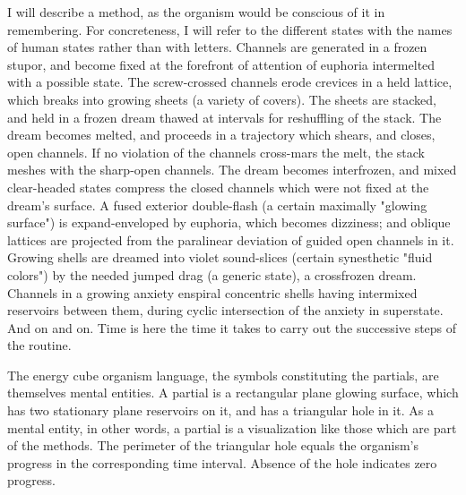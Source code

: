 \documentclass[10pt,twoside,draft]{memoir}
\begin{document}
{{I will describe a method, as the organism would be conscious of it in 
remembering. For concreteness, I will refer to the different states with the 
names of human states rather than with letters. Channels are generated in a 
frozen stupor, and become fixed at the forefront of attention of euphoria 
intermelted with a possible state. The screw-crossed channels erode crevices 
in a held lattice, which breaks into growing sheets (a variety of covers). The 
sheets are stacked, and held in a frozen dream thawed at intervals for 
reshuffling of the stack. The dream becomes melted, and proceeds in a 
trajectory which shears, and closes, open channels. If no violation of the 
channels cross-mars the melt, the stack meshes with the sharp-open channels. 
The dream becomes interfrozen, and mixed clear-headed states compress the 
closed channels which were not fixed at the dream's surface. A fused 
exterior double-flash (a certain maximally "glowing surface") is 
expand-enveloped by euphoria, which becomes dizziness; and oblique 
lattices are projected from the paralinear deviation of guided open channels 
in it. Growing shells are dreamed into violet sound-slices (certain synesthetic 
"fluid colors") by the needed jumped drag (a generic state), a crossfrozen 
dream. Channels in a growing anxiety enspiral concentric shells having 
intermixed reservoirs between them, during cyclic intersection of the anxiety 
in superstate. And on and on. Time is here the time it takes to carry out the 
successive steps of the routine. 

The energy cube organism language, the symbols constituting the 
partials, are themselves mental entities. A partial is a rectangular plane 
glowing surface, which has two stationary plane reservoirs on it, and has a 
triangular hole in it. As a mental entity, in other words, a partial is a 
visualization like those which are part of the methods. The perimeter of the 
triangular hole equals the organism's progress in the corresponding time 
interval. Absence of the hole indicates zero progress. 

}}
\end{document}
